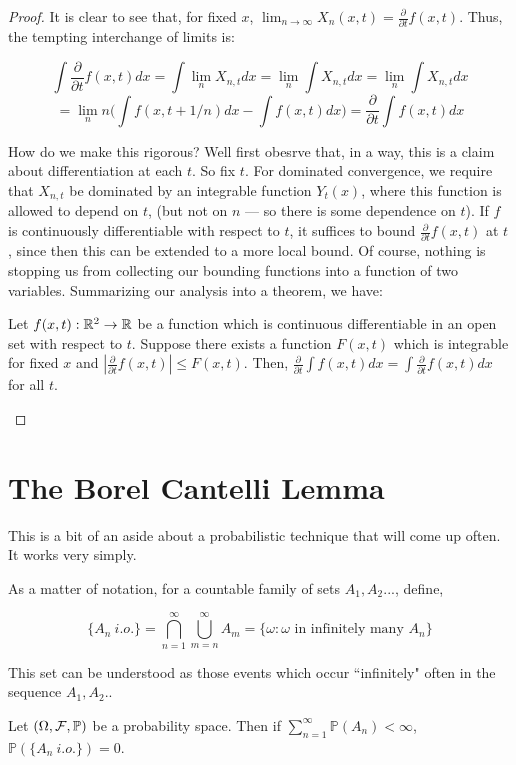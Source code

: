 \begin{proof}
        It is clear to see that, for fixed $x$, $\lim_{n \to \infty}X_n(x,t) = \frac{\partial}{\partial t}f(x,t)$. 
        Thus, the tempting interchange of limits is:

        \[ \int \frac{\partial}{\partial t}f(x,t) dx = \int \lim_n X_{n,t} dx = \lim_n \int X_{n,t} dx = \lim_n \int X_{n,t} dx \]
        \[ = \lim_n n \bigg(\int f(x,t+1/n)dx - \int f(x,t)dx\bigg) = \frac{\partial}{\partial t} \int f(x,t)dx \]

        How do we make this rigorous? Well first obesrve that, in a way, this is a claim about 
        differentiation at each $t$. So fix $t$. For dominated convergence, we require that
        $X_{n,t}$ be dominated by an integrable function $Y_t(x)$, where this function is allowed to depend on 
        $t$, (but not on $n$ — so there is some dependence on $t$). If $f$ is continuously differentiable with respect to 
        $t$, it suffices to bound $\frac{\partial}{\partial t}f(x,t)$ at $t$, since then this can be extended to a more 
        local bound. Of course, nothing is stopping us from collecting our bounding functions into 
        a function of two variables. Summarizing our analysis into a theorem, we have: 

        \begin{theorem}
            Let $f(x,t) : \mathbb R^2 \to \mathbb R$ be a function which is continuous differentiable in an open set with respect to 
            $t$. Suppose there exists a function $F(x,t)$ which is integrable for fixed $x$ and 
            $|\frac{\partial}{\partial t}f(x,t)| \leq F(x,t)$. Then, $\frac{\partial}{\partial t} \int f(x,t)dx =\int \frac{\partial}{\partial t}  f(x,t)dx$ 
            for all $t$.
        \end{theorem}

    \end{proof}

    \section{The Borel Cantelli Lemma}

    This is a bit of an aside about a probabilistic technique that will come up often. It works very simply. 

    \begin{definition} 
        As a matter of notation, for a countable family of sets $A_1,A_2...$, define, 

        \[ \{A_n \: i.o. \} = \bigcap_{n=1}^\infty \bigcup_{m=n}^\infty A_m = \{ \omega : \omega \text{ in infinitely many } A_n \} \]

        This set can be understood as those events which occur ``infinitely" often in the sequence $A_1,A_2..$
    \end{definition}
    \begin{lemma}
        Let $(\Omega, \mathcal F, \mathbb P)$ be a probability space. Then if 
        $\sum_{n=1}^\infty \mathbb P(A_n) < \infty$, $\mathbb P(\{A_n \: i.o.\}) = 0$.
    \end{lemma}

